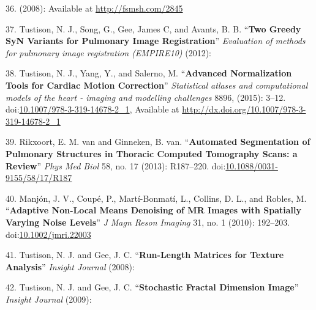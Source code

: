 \documentclass[11pt,]{article}
\begin{document}
36. (2008): Available at \url{http://fsmsh.com/2845}

37. Tustison, N. J., Song, G., Gee, James C, and Avants, B. B.
``\textbf{Two Greedy SyN Variants for Pulmonary Image Registration}''
\emph{Evaluation of methods for pulmonary image registration (EMPIRE10)}
(2012):

38. Tustison, N. J., Yang, Y., and Salerno, M. ``\textbf{Advanced
Normalization Tools for Cardiac Motion Correction}'' \emph{Statistical
atlases and computational models of the heart - imaging and modelling
challenges} 8896, (2015): 3--12.
doi:\href{http://dx.doi.org/10.1007/978-3-319-14678-2_1}{10.1007/978-3-319-14678-2\_1},
Available at \url{http://dx.doi.org/10.1007/978-3-319-14678-2_1}

39. Rikxoort, E. M. van and Ginneken, B. van. ``\textbf{Automated
Segmentation of Pulmonary Structures in Thoracic Computed Tomography
Scans: a Review}'' \emph{Phys Med Biol} 58, no. 17 (2013): R187--220.
doi:\href{http://dx.doi.org/10.1088/0031-9155/58/17/R187}{10.1088/0031-9155/58/17/R187}

40. Manj{ó}n, J. V., Coup{é}, P., Mart{í}-Bonmat{í}, L., Collins, D. L.,
and Robles, M. ``\textbf{Adaptive Non-Local Means Denoising of MR Images
with Spatially Varying Noise Levels}'' \emph{J Magn Reson Imaging} 31,
no. 1 (2010): 192--203.
doi:\href{http://dx.doi.org/10.1002/jmri.22003}{10.1002/jmri.22003}

41. Tustison, N. J. and Gee, J. C. ``\textbf{Run-Length Matrices for
Texture Analysis}'' \emph{Insight Journal} (2008):

42. Tustison, N. J. and Gee, J. C. ``\textbf{Stochastic Fractal
Dimension Image}'' \emph{Insight Journal} (2009):
\end{document}
